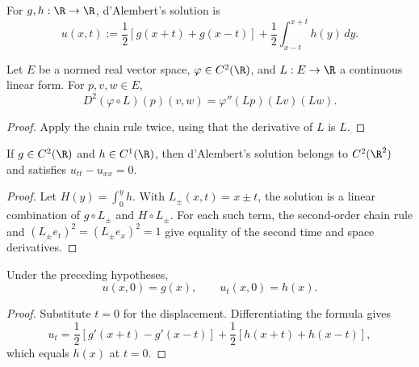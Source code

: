 \begin{definition}
\label{def:dalembert-formula}
\leanok
For $g,h:\R\to\R$, d'Alembert's solution is
$$u(x,t):=\frac12[g(x+t)+g(x-t)]
+\frac12\int_{x-t}^{x+t}h(y)\,dy.$$
\end{definition}

\begin{lemma}
\label{lem:second-order-chain-rule-linear-form}
\leanok
Let $E$ be a normed real vector space, $\varphi\in C^2(\R)$, and
$L:E\to\R$ a continuous linear form. For $p,v,w\in E$,
$$D^2(\varphi\circ L)(p)(v,w)=\varphi''(Lp)(Lv)(Lw).$$
\end{lemma}
\begin{proof}
\leanok
\sketch Apply the chain rule twice, using that the derivative of $L$ is $L$.
\end{proof}

\begin{theorem}[Solution of wave equation, $n = 1$]
\label{thm:wave-equation-dalembert-solution}
\leanok
If $g\in C^2(\R)$ and $h\in C^1(\R)$, then d'Alembert's solution belongs to
$C^2(\R^2)$ and satisfies $u_{tt}-u_{xx}=0$.
\end{theorem}
\begin{proof}
\leanok
\sketch Let $H(y)=\int_0^yh$. With $L_\pm(x,t)=x\pm t$, the solution is a
linear combination of $g\circ L_\pm$ and $H\circ L_\pm$. For each such term,
the second-order chain rule and $(L_\pm e_t)^2=(L_\pm e_x)^2=1$ give equality
of the second time and space derivatives.
\end{proof}

\begin{theorem}
\label{thm:dalembert-initial-conditions}
\leanok
Under the preceding hypotheses,
$$u(x,0)=g(x),
\qquad
u_t(x,0)=h(x).$$
\end{theorem}
\begin{proof}
\leanok
\sketch Substitute $t=0$ for the displacement. Differentiating the formula
gives
$$u_t=\frac12[g'(x+t)-g'(x-t)]
+\frac12[h(x+t)+h(x-t)],$$
which equals $h(x)$ at $t=0$.
\end{proof}

